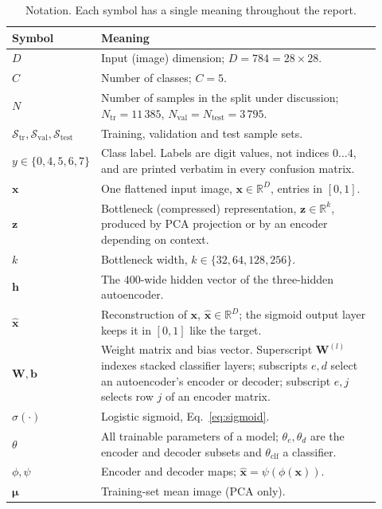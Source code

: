 \documentclass[11pt,a4paper]{article}
\newcommand{\R}{\mathbb{R}}\newcommand{\given}{\mid}\newcommand{\Acc}{\mathrm{Acc}}
\begin{document}
\begin{table}[htbp]\centering\small
\caption{Notation.  Each symbol has a single meaning throughout the report.}\label{tab:notation}
\begin{tabular}{@{}p{0.10\linewidth}p{0.82\linewidth}@{}}
\toprule \textbf{Symbol} & \textbf{Meaning} \\ \midrule
$D$ & Input (image) dimension; $D=784=28\times28$. \\
$C$ & Number of classes; $C=5$. \\
$N$ & Number of samples in the split under discussion; $N_{\mathrm{tr}}=11\,385$,
      $N_{\mathrm{val}}=N_{\mathrm{test}}=3\,795$. \\
$\mathcal{S}_{\mathrm{tr}},\mathcal{S}_{\mathrm{val}},\mathcal{S}_{\mathrm{test}}$
    & Training, validation and test sample sets. \\
$y\in\{0,4,5,6,7\}$ & Class label.  Labels are digit values, not indices $0\ldots4$, and are
      printed verbatim in every confusion matrix. \\
$\mathbf{x}$ & One flattened input image, $\mathbf{x}\in\R^{D}$, entries in $[0,1]$. \\
$\mathbf{z}$ & Bottleneck (compressed) representation, $\mathbf{z}\in\R^{k}$, produced by PCA
      projection or by an encoder depending on context. \\
$k$ & Bottleneck width, $k\in\{32,64,128,256\}$. \\
$\mathbf{h}$ & The $400$-wide hidden vector of the three-hidden autoencoder. \\
$\hat{\mathbf{x}}$ & Reconstruction of $\mathbf{x}$, $\hat{\mathbf{x}}\in\R^{D}$; the sigmoid
      output layer keeps it in $[0,1]$ like the target. \\
$\mathbf{W},\mathbf{b}$ & Weight matrix and bias vector.  Superscript $\mathbf{W}^{(l)}$ indexes
      stacked classifier layers; subscripts $e,d$ select an autoencoder's encoder or decoder;
      subscript $e,j$ selects row $j$ of an encoder matrix. \\
$\sigma(\cdot)$ & Logistic sigmoid, Eq.~\eqref{eq:sigmoid}. \\
$\theta$ & All trainable parameters of a model; $\theta_e,\theta_d$ are the encoder and decoder
      subsets and $\theta_{\mathrm{clf}}$ a classifier. \\
$\phi,\psi$ & Encoder and decoder maps; $\hat{\mathbf{x}}=\psi(\phi(\mathbf{x}))$. \\
$\boldsymbol{\mu}$ & Training-set mean image (PCA only). \\

\end{tabular}
\end{table}
\end{document}
